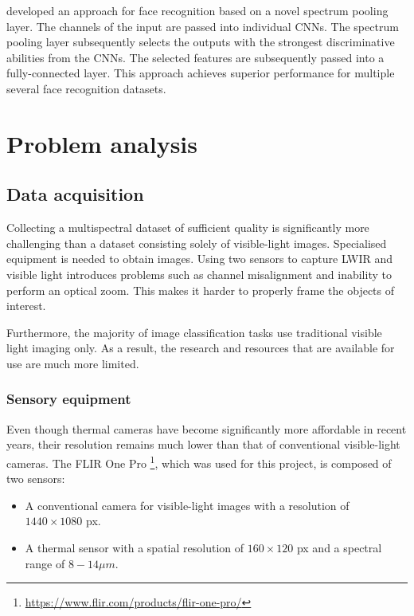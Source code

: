 \documentclass{l4proj}
\begin{document}
\citet{wu_intraspectrum_2020} developed an approach for face recognition based on a novel spectrum pooling layer. The channels of the input are passed into individual CNNs. The spectrum pooling layer subsequently selects the outputs with the strongest discriminative abilities from the CNNs. The selected features are subsequently passed into a fully-connected layer. This approach achieves superior performance for multiple several face recognition datasets.


\chapter{Problem analysis}
\label{analysis}

\section{Data acquisition}

Collecting a multispectral dataset of sufficient quality is significantly more challenging than a dataset consisting solely of visible-light images. Specialised equipment is needed to obtain images. Using two sensors to capture LWIR and visible light introduces problems such as channel misalignment and inability to perform an optical zoom. This makes it harder to properly frame the objects of interest.

Furthermore, the majority of image classification tasks use traditional visible light imaging only. As a result, the research and resources that are available for use are much more limited.

\subsection{Sensory equipment}
\label{sensory_equipment}

Even though thermal cameras have become significantly more affordable in recent years, their resolution remains much lower than that of conventional visible-light cameras. The FLIR One Pro \footnote{\url{https://www.flir.com/products/flir-one-pro/}}, which was used for this project, is composed of two sensors:

\begin{itemize}
  \item A conventional camera for visible-light images with a resolution of $1440 \times 1080$ px.
  \item A thermal sensor with a spatial resolution of $160 \times 120$ px and a spectral range of $8 - 14 \mu m$.
\end{itemize}
\end{document}
